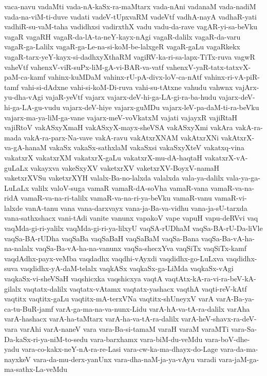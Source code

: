 {vaca-navu
vadaMti
vada-nA-kaSx-ra-maMtarx
vada-nAni
vadanaM
vada-nadiM
vada-na-viM-ti-duve
vadati
vadeV-tUpxvaRM
vadeVtf
vadhA-nayA
vadhaR-yati
vadhiR-su-vaM-taha
vadidhxsi
vadirxthX
vadu
vadu-da-rave
vagAR-yi-sa-beVku
vagaR
vagaRH
vagaR-da-lA-ta-neY-kayx-nAgi
vagaR-dalilx
vagaR-da-varu
vagaR-ga-Lalilx
vagaR-ga-Le-na-si-koM-be-lalxgeR
vagaR-gaLu
vagaRkekx
vagaR-tarx-yeY-kayx-si-dadhxyXthaRM
vagiRV-ka-ri-sa-lapx-TiTx-ruva
vagwR
vaheVtf
vahenxV-viR-suPx-liM-gA-vi-BAR-va-vatf
vahenxV-yaR-tatx-tatxvX-paM-ca-kamf
vahinx-kuMDaM
vahinx-rU-pA-divx-loV-ca-nAtf
vahinx-ri-vA-piR-tamf
vahi-si-dAdxne
vahi-si-koM-Di-ruva
vahi-su-tAtxne
vahudu
vahwnx
vajArx-yu-dha-vAgi
vajaR-yeVtf
vajarx
vajarx-deV-hi-ga-LA-gi-ra-ba-hudu
vajarx-deV-hi-ga-LA-gu-vudu
vajarx-deV-hiye
vajarx-guMDu
vajarx-leV-pa-daM-ti-ra-beVku
vajarx-ma-ya-liM-ga-vane
vajarx-meV-voVkatxM
vajati
vajayxR
vajiRtaH
vajiRtoV
vakASxyXmaH
vakASxyX-mayx-sheVSA
vakASxyXmi
vakAra
vakA-ra-mada
vakA-ra-parx-Na-vave
vakA-ravu
vakAtxrXNAM
vakAtxrXNi
vakAtxrX-va-gA-hanaM
vakaSx
vakaSx-sathxlaM
vakaSxsi
vakaSxyXteV
vakatxq-vina
vakatxrX
vakatxrXM
vakatxrX-gaLu
vakatxrX-mu-dA-haqtaH
vakatxrX-vA-guLaLx
vakayxva
vakeSxyXV
vaketxrXV
vaketxrXV-BoyxV-namaH
vaketxrXVSu
vaketxrXYH
valalx-Ba-no-lalxda
valalxda
vala-ya-dalilx
vala-ya-ga-LuLaLx
valilx
valoV-suga
vamaR
vamaR-dA-soVha
vamaR-vana
vamaR-va-na-ridA
vamaR-va-na-ri-talilx
vamaR-va-na-ri-ya-beVku
vamaR-vanu
vamaR-vi-lalxde
vanA-tanu
vana
vana-darxvayx
vana-ja-Ba-va-vidhu
vana-ja-sU-tarxda
vana-sathxshacx
vani-tAdi
vanite
vanunx
vapakoV
vape
vapuH
vapu-deRVvi
vaq
vaqMda-gi-ri-yalilx
vaqMda-gi-ri-ya-lilxyU
vaqSA-rUDhaM
vaqSa-BA-rU-Da-liVle
vaqSa-BA-rUDha
vaqSaBa
vaqSaBaH
vaqSaBaM
vaqSa-Bana
vaqSa-Ba-vA-ha-na-nalalx
vaqSa-Ba-vA-ha-na-vanunx
vaqSa-shecxYva
vaqSiTx
vaqSiTx-kamf
vaqdAdhx-payx-veMba
vaqdadhx
vaqdhi-vAyxdi
vaqdidhx-go-LuLxva
vaqdidhx-suva
vaqdidhx-yA-daM-telalx
vaqkASx
vaqkaSx-ga-LiMda
vaqkaSx-vAgi
vaqkaSx-vi-sheVSaH
vaqshicxka
vaqshicxya
vaqtA
vaqtAtx-kA-ra-vi-ra-beV-kA-gilalx
vaqtatx-dalilx
vaqtatx-vAtamx
vaqtatx-yashacx
vaqthA
vaqti-reV-kAtf
vaqtitx
vaqtitx-gaLu
vaqtitx-mA-terxVNa
vaqtitx-shUneyxV
varA
varA-Ba-ya-ca-tu-BuR-jamf
varA-ga-ma-na-va-nunx-Lidu
varA-hA-va-tA-ra-dalilx
varAha
varA-hashacx
varA-ha-taMtarx
varA-ha-va-tA-ra-dalilx
varA-heV-shavx-ra-deV-vara
varAhi
varA-naneV
vara
vara-Ba-si-tamaM
varaH
varaM
varaMTi
vara-Sa-Da-kaSx-ri-ya-niM-to-sedu
vara-barxhamx
vara-biM-du-veMdu
vara-boV-dhe-yadu
vara-co-kakx-neY-nA-ra-re-Lasi
vara-cw-ka-ma-dhayx-do-Lage
vara-da-ma-nayxkeV
vara-da-mu-derx-yanUnx
vara-dha-naM-ja-ya-vAyu
varadi
vara-jaM-ga-ma-sathx-La-veMdu
}
